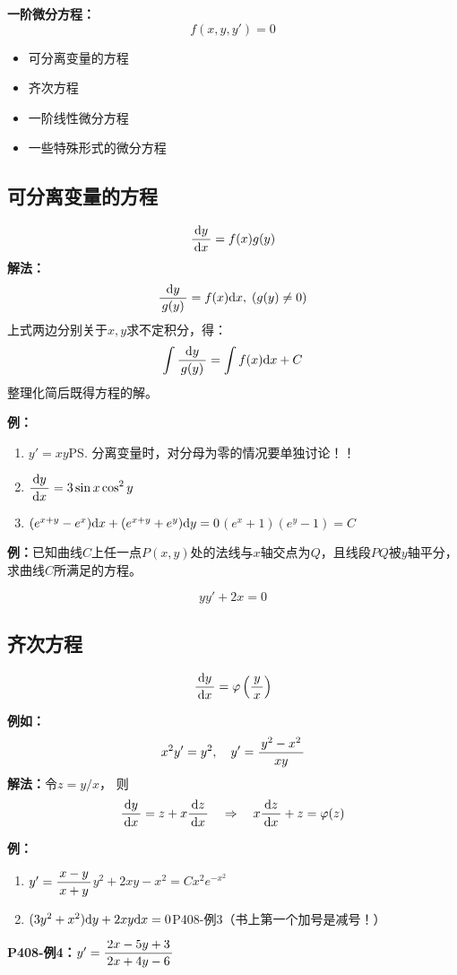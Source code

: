 {\bf 一阶微分方程：}
$$f(x,y,y')=0$$ 
\begin{itemize}
  \item 可分离变量的方程 
  \item 齐次方程 
  \item 一阶线性微分方程 
  \item 一些特殊形式的微分方程
\end{itemize}

\subsection{可分离变量的方程}

$${\displaystyle\frac{\,{\mathrm{d} y}\,}{\,{\mathrm{d} x}\,}=f(x)g(y)}$$ 
{\bf 解法：}
$$\displaystyle\frac{\,{\mathrm{d} y}\,}{\,{g(y)}\,}=f(x)\mathrm{d} x,\;(g(y)\ne 0)$$ 
上式两边分别关于$x,y$求不定积分，得：
$$\displaystyle\int\displaystyle\frac{\,{\mathrm{d} y}\,}{\,{g(y)}\,}=\displaystyle\int f(x)\mathrm{d} x+C$$ 
整理化简后既得方程的解。

{\bf 例：}
\begin{enumerate}[(1)]
  \setlength{\itemindent}{1cm}
  \item $y'=xy$\ps{分离变量时，对分母为零的情况要单独讨论！！}
  \item $\displaystyle\frac{\,{\mathrm{d} y}\,}{\,{\mathrm{d} x}\,}=3\sin x\cos^2 y$
  \item $(e^{x+y}-e^x)\mathrm{d} x+(e^{x+y}+e^y)\mathrm{d} y=0$\hfill $(e^x+1)(e^y-1)=C$
\end{enumerate}

{\bf 例：}已知曲线$C$上任一点$P(x,y)$处的法线与$x$轴交点为$Q$，且线段$PQ$被$y$轴平分，
求曲线$C$所满足的方程。

$$yy'+2x=0$$

\subsection{齐次方程}

$${\displaystyle\frac{\,{\mathrm{d} y}\,}{\,{\mathrm{d} x}\,}=\varphi\left(\displaystyle\frac{\,{y}\,}{\,{x}\,}\right)}$$

{\bf 例如：}
$$x^2y'=y^2,\quad y'=\displaystyle\frac{\,{y^2-x^2}\,}{\,{xy}\,}$$ 
{\bf 解法：}令$z=y/x$， 则
$$\displaystyle\frac{\,{\mathrm{d} y}\,}{\,{\mathrm{d} x}\,}=z+x\displaystyle\frac{\,{\mathrm{d} z}\,}{\,{\mathrm{d} x}\,}\quad\Rightarrow\quad
x\displaystyle\frac{\,{\mathrm{d} z}\,}{\,{\mathrm{d} x}\,}+z=\varphi(z)$$

{\bf 例：}
\begin{enumerate}[(1)]
  \setlength{\itemindent}{1cm}
  \item $y'=\displaystyle\frac{\,{x-y}\,}{\,{x+y}\,}$\hfill $y^2+2xy-x^2=Cx^2e^{-x^2}$
  \item $(3y^2+x^2)\mathrm{d} y+2xy\mathrm{d} x=0$\hfill P408-例3（书上第一个加号是减号！）
\end{enumerate}

{\bf P408-例4：}$y'=\displaystyle\frac{\,{2x-5y+3}\,}{\,{2x+4y-6}\,}$

